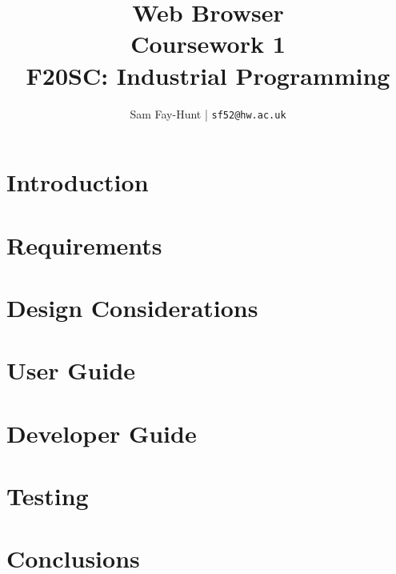 \documentclass[11pt]{article}
\begin{document}
\title{%
	\bf Web Browser\\ 
	\large Coursework 1 \\
	F20SC: Industrial Programming}

\author{
	Sam Fay-Hunt | \texttt{sf52@hw.ac.uk}
}

\maketitle
\thispagestyle{empty}
\pagebreak


\tableofcontents
\thispagestyle{empty}
\pagebreak


\setcounter{page}{1}

\section{Introduction}


\section{Requirements}

\section{Design Considerations}

\section{User Guide}

\section{Developer Guide}

\section{Testing}

\section{Conclusions}
\end{document}
